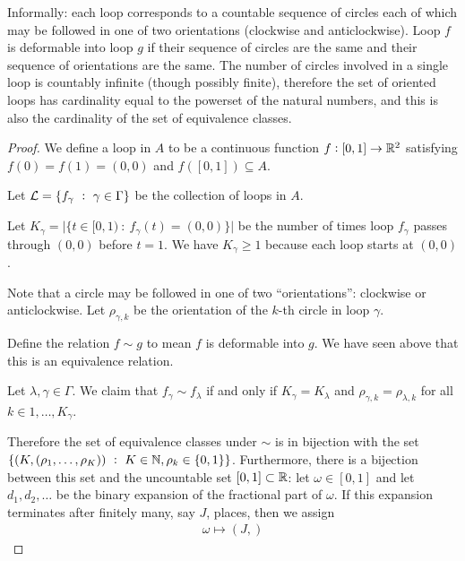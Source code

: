 \begin{enumerate}[label=(\alph*)]
  Informally: each loop corresponds to a countable sequence of circles each of which may be followed in one of
  two orientations (clockwise and anticlockwise). Loop $f$ is deformable into loop $g$ if their sequence of
  circles are the same and their sequence of orientations are the same. The number of circles involved in a
  single loop is countably infinite (though possibly finite), therefore the set of oriented loops has
  cardinality equal to the powerset of the natural numbers, and this is also the cardinality of the set of
  equivalence classes.

  \begin{proof}
    We define a loop in $A$ to be a continuous function $f: [0, 1] \to \mathbb{R}^2$ satisfying $f(0) = f(1) = (0, 0)$
    and $f([0, 1]) \subseteq A$.

    Let $\mathcal L = \{f_\gamma ~:~ \gamma \in \Gamma\}$ be the collection of loops in $A$.

    Let $K_\gamma = \big|\{t \in [0, 1) ~:~ f_\gamma(t) = (0, 0) \}\big|$ be the number of times
    loop $f_\gamma$ passes through $(0, 0)$ before $t = 1$. We have $K_\gamma \geq 1$ because each loop starts
    at $(0, 0)$.

    Note that a circle may be followed in one of two ``orientations​'': clockwise or anticlockwise.
    Let $\rho_{\gamma, k}$ be the orientation of the $k$-th circle in loop $\gamma$.

    Define the relation $f \sim g$ to mean $f$ is deformable into $g$. We have seen above that this is an
    equivalence relation.

    Let $\lambda, \gamma \in \Gamma$. We claim that $f_\gamma \sim f_\lambda$ if and only
    if $K_\gamma = K_\lambda$ and $\rho_{\gamma, k} = \rho_{\lambda, k}$ for all $k \in 1, \ldots, K_\gamma$.

    Therefore the set of equivalence classes under $\sim$ is in bijection with the
    set $\{(K, (\rho_1, \ldots, \rho_K)) ~:~ K \in \mathbb{N}, \rho_k \in \{0, 1\}\}$. Furthermore, there is a
    bijection between this set and the uncountable set $[0, 1] \subset \mathbb{R}$: let $\omega \in [0, 1]$ and
    let $d_1, d_2, \ldots$ be the binary expansion of the fractional part of $\omega$. If this expansion
    terminates after finitely many, say $J$, places, then we assign
    \begin{align*}
      \omega \mapsto (J, )
    \end{align*}



\end{proof}
\end{enumerate}
